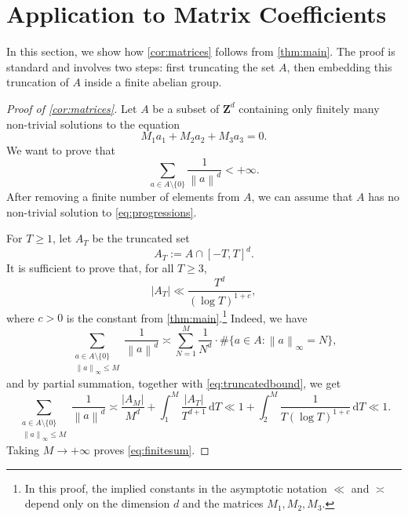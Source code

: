 \documentclass{daj}
\theoremstyle{definition}
\newcommand{\Z}{\ensuremath{\mathbf{Z}}}
\newcommand{\norm}[1]{\left\|#1\right\|}
\begin{document}
\section{Application to Matrix Coefficients}
\label{sec:matrix}

In this section, we show how \cref{cor:matrices} follows from \cref{thm:main}. The proof is standard and involves two steps: first truncating the set $A$, then embedding this truncation of $A$ inside a finite abelian group.

\begin{proof}[Proof of \cref{cor:matrices}]
Let $A$ be a subset of $\Z^d$ containing only finitely many non-trivial solutions to the equation 
\begin{equation}
\label{eq:progressions}
M_1 a_1 + M_2 a_2  + M_3 a_3 = 0.
\end{equation}
We want to prove that
\begin{equation}
\label{eq:finitesum}
\sum_{a\in A\setminus\{0\}} \frac{1}{\norm{a}^d} < +\infty.
\end{equation}
After removing a finite number of elements from $A$, we can assume that $A$ has no non-trivial solution to \cref{eq:progressions}.

For $T \geq 1$, let $A_T$  be the truncated set 
\begin{equation*}
A_T := A \cap [-T, T]^d.
\end{equation*}
It is sufficient to prove that, for all $T\geq 3$,
\begin{equation}
\label{eq:truncatedbound}
|A_T| \ll \frac{T^d}{(\log{T})^{1+c}},
\end{equation}
where $c > 0$ is the constant from \cref{thm:main}.\footnote{In this proof, the implied constants in the asymptotic notation $\ll$ and $\asymp$ depend only on the dimension $d$ and the matrices $M_1, M_2, M_3$.}
Indeed, we have
\begin{equation*}
\sum_{\substack{a\in A\setminus \{0\}\\ \norm{a}_{\infty} \leq M}} \frac{1}{\norm{a}^d} \asymp \sum_{N=1}^{M} \frac{1}{N^d}\cdot \# \{a\in A : \norm{a}_{\infty} = N\},
\end{equation*}
and by partial summation, together with \cref{eq:truncatedbound}, we get
\begin{equation*}
\sum_{\substack{a\in A\setminus \{0\}\\ \norm{a}_{\infty} \leq M}} \frac{1}{\norm{a}^d} \asymp \frac{|A_M|}{M^d} +  \int_{1}^{M} \frac{|A_T|}{T^{d+1}} \,\mathrm{d}T \ll 1 + \int_2^M \frac{1}{T (\log{T})^{1+c}} \,\mathrm{d}T \ll 1.
\end{equation*}
Taking $M \to +\infty$ proves \cref{eq:finitesum}.


\end{proof}
\end{document}
